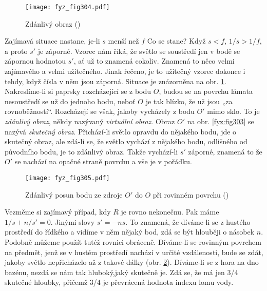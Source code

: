     \begin{figure}[ht!] %
      \centering
      \texttt{[image: fyz\_fig304.pdf]}
      \caption{Zdánlivý obraz
               (\cite[s.~361]{Feynman01})}
      \label{fyz:fig304}
    \end{figure}
    
    Zajímavá situace nastane, je-li \(s\) menší než \(f\) Co se stane? Když \(s<f\), \(1/s>1/f\), a 
    proto \(s'\) je záporné. Vzorec nám říká, že světlo se soustředí jen v bodě se zápornou 
    hodnotou \(s'\), ať už to znamená cokoliv. Znamená to něco velmi zajímavého a velmi užitečného. 
    Jinak řečeno, je to užitečný vzorec dokonce i tehdy, když čísla v něm jsou záporná. Situace je 
    znázorněna na obr. \ref{fyz:fig304}. Nakreslíme-li si paprsky rozcházející se z bodu \(O\), 
    budou se na povrchu lámata nesoustředí se už do jednoho bodu, neboť \(O\) je tak blízko, že už 
    jsou „za rovnoběžností“. Rozcházejí se však, jakoby vycházely z bodu \(O'\) mimo sklo. To je 
    \emph{zdánlivý obraz}, někdy nazývaný \emph{virtuální obraz}.  Obraz \(O'\) na obr. 
    \ref{fyz:fig303} se nazývá \emph{skutečný obraz}. Přichází-li světlo opravdu do nějakého bodu, 
    jde o skutečný obraz, ale zdá-li se, že světlo vychází z nějakého bodu, odlišného od původního 
    bodu, je to zdánlivý obraz. Takže vychází-li \(s'\) záporné, znamená to že \(O'\) se nachází na 
    opačné straně povrchu a vše je v pořádku.
    

    \begin{figure}[ht!] %
      \centering
      \texttt{[image: fyz\_fig305.pdf]}
      \caption{Zdánlivý posun bodu ze zdroje \(O'\) do \(O\) při rovinném povrchu
               (\cite[s.~361]{Feynman01})}
      \label{fyz:fig305}
    \end{figure}
    
    Vezměme si zajímavý případ, kdy \(R\) je rovno nekonečnu. Pak máme \(1/s + n/s' = 0\). Jinými 
    slovy \(s' = -ns\). To znamená, že díváme-li se z hustého prostředí do řídkého a vidíme v něm 
    nějaký bod, zdá se být hlouběji o násobek \(n\). Podobně můžeme použít tutéž rovnici obráceně. 
    Díváme-li se rovinným povrchem na předmět, jenž se v hustém prostředí nachází v určité 
    vzdálenosti, bude se zdát, jakoby světlo nepřicházelo až z takové dálky (obr. 
    \ref{fyz:fig305}). Díváme-li se z hora na dno bazénu, nezdá se nám tak hluboký,jaký skutečně 
    je. Zdá se, že má jen \num{3/4} skutečné hloubky, přičemž \num{3/4} je převrácená hodnota 
    indexu lomu vody.
    
